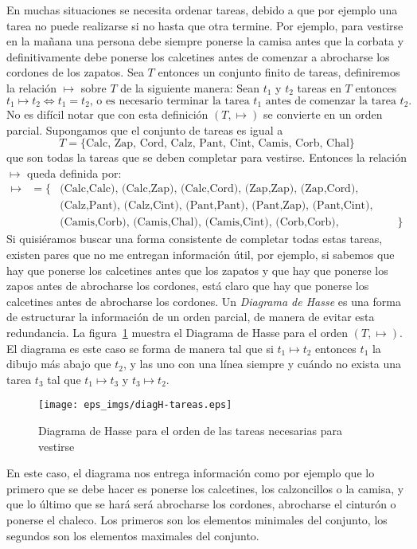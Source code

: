 \begin{ejemplo}
En muchas situaciones se necesita ordenar tareas, debido a que por ejemplo una tarea no puede realizarse si no hasta que otra termine.
Por ejemplo, para vestirse en la mañana una persona debe siempre ponerse la camisa antes que la corbata y definitivamente debe ponerse los calcetines antes de comenzar a abrocharse los cordones de los zapatos.
Sea $T$ entonces un conjunto finito de tareas, definiremos la relación $\mapsto$ sobre $T$ de la siguiente manera:
Sean $t_1$ y $t_2$ tareas en $T$ entonces
\[
t_1\mapsto t_2\Leftrightarrow t_1=t_2\text{, o es necesario terminar la tarea }t_1\text{ antes de comenzar la tarea }t_2.
\]
No es difícil notar que con esta definición $(T,\mapsto)$ se convierte en un orden parcial.
Supongamos que el conjunto de tareas es igual a 
\[
T=\{\text{Calc, Zap, Cord, Calz, Pant, Cint, Camis, Corb, Chal}
\}
\] 
que son todas la tareas que se deben completar para vestirse.
Entonces la relación $\mapsto$ queda definida por:
\[
\begin{array}{rcll}
\mapsto& = \{& \text{(Calc,Calc), (Calc,Zap), (Calc,Cord), (Zap,Zap), (Zap,Cord),(Cord, Cord), (Calz,Calz),} \\ 
& & \text{(Calz,Pant), (Calz,Cint), (Pant,Pant), (Pant,Zap), (Pant,Cint), (Camis, Camis),} \\
& & \text{(Camis,Corb), (Camis,Chal), (Camis,Cint), (Corb,Corb), (Corb,Chal), (Chal,Chal)} & \}
\end{array}
\]
Si quisiéramos buscar una forma consistente de completar todas estas tareas, existen pares que no me entregan información útil, por ejemplo, si sabemos que hay que ponerse los calcetines antes que los zapatos y que hay que ponerse los zapos antes de abrocharse los cordones, está claro que hay que ponerse los calcetines antes de abrocharse los cordones.
Un \emph{Diagrama de Hasse} es una forma de estructurar la información de un orden parcial, de manera de evitar esta redundancia.
La figura~\ref{fig:diagH-tareas} muestra el Diagrama de Hasse para el orden $(T,\mapsto)$.
El diagrama es este caso se forma de manera tal que si $t_1\mapsto t_2$ entonces $t_1$ la dibujo más abajo que $t_2$, y las uno con una línea siempre y cuándo no exista una tarea $t_3$ tal que $t_1\mapsto t_3$ y $t_3\mapsto t_2$.

\begin{figure}[h!]
\centering
\texttt{[image: eps\_imgs/diagH-tareas.eps]}
\caption{Diagrama de Hasse para el orden de las tareas necesarias para vestirse}
\label{fig:diagH-tareas}
\end{figure}

En este caso, el diagrama nos entrega información como por ejemplo que lo primero que se debe hacer es ponerse los calcetines, los calzoncillos o la camisa, y que lo último que se hará será abrocharse los cordones, abrocharse el cinturón o ponerse el chaleco.
Los primeros son los elementos minimales del conjunto, los segundos son los elementos maximales del conjunto.
\end{ejemplo}

